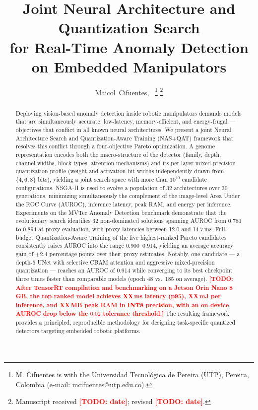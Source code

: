 \documentclass[journal]{IEEEtran}
\newcommand{\TODO}[1]{\textcolor{red}{\textbf{[TODO: #1]}}}
\begin{document}
\title{Joint Neural Architecture and Quantization Search\\
for Real-Time Anomaly Detection on Embedded Manipulators}

\author{Maicol~Cifuentes,~%
\thanks{M. Cifuentes is with the Universidad Tecnol\'ogica de Pereira (UTP),
Pereira, Colombia (e-mail: mcifuentes@utp.edu.co).}%
\thanks{Manuscript received \TODO{date}; revised \TODO{date}.}}

\maketitle

\begin{abstract}
Deploying vision-based anomaly detection inside robotic manipulators demands
models that are simultaneously accurate, low-latency, memory-efficient, and
energy-frugal — objectives that conflict in all known neural architectures.
We present a joint Neural Architecture Search and Quantization-Aware Training
(NAS+QAT) framework that resolves this conflict through a four-objective
Pareto optimization.
A genome representation encodes both the macro-structure of the detector
(family, depth, channel widths, block types, attention mechanisms) and its
per-layer mixed-precision quantization profile (weight and activation bit
widths independently drawn from $\{4,6,8\}$ bits), yielding a joint search
space with more than $10^{10}$ candidate configurations.
NSGA-II is used to evolve a population of 32 architectures over 30 generations,
minimizing simultaneously the complement of the image-level Area Under the
ROC Curve (AUROC), inference latency, peak RAM, and energy per inference.
Experiments on the MVTec Anomaly Detection benchmark demonstrate that the
evolutionary search identifies 32 non-dominated solutions spanning AUROC from
0.781 to 0.894 at proxy evaluation, with proxy latencies between 12.0 and
14.7\,ms.
Full-budget Quantization-Aware Training of the five highest-ranked Pareto
candidates consistently raises AUROC into the range 0.900--0.914, yielding an
average accuracy gain of $+2.4$ percentage points over their proxy estimates.
Notably, one candidate — a depth-5 UNet with selective CBAM attention and
aggressive mixed-precision quantization — reaches an AUROC of 0.914 while
converging to its best checkpoint three times faster than comparable models
(epoch 48 vs.\ 185 on average).
\TODO{After TensorRT compilation and benchmarking on a Jetson Orin Nano 8\,GB,
the top-ranked model achieves XX\,ms latency (p95), XX\,mJ per inference, and
XX\,MB peak RAM in INT8 precision, with an on-device AUROC drop below the
$0.02$ tolerance threshold.}
The resulting framework provides a principled, reproducible methodology for
designing task-specific quantized detectors targeting embedded robotic
platforms.
\end{abstract}
\end{document}
